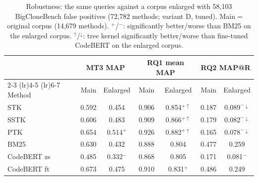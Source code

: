 \begin{table}[t]
\centering
\caption{Robustness: the same queries against a corpus enlarged with 58,103 BigCloneBench false positives (72,782 methods; variant D, tuned). Main = original corpus (14,679 methods). $^{+}$/$^{-}$: significantly better/worse than BM25 on the enlarged corpus. $^{\uparrow}$/$^{\downarrow}$: tree kernel significantly better/worse than fine-tuned CodeBERT on the enlarged corpus. }
\label{tab:e5}
\small
\begin{tabular}{lcccccc}
\toprule
 & \multicolumn{2}{c}{MT3 MAP} & \multicolumn{2}{c}{RQ1 mean MAP} & \multicolumn{2}{c}{RQ2 MAP@R} \\
\cmidrule(lr){2-3} \cmidrule(lr){4-5} \cmidrule(lr){6-7}
Method & Main & Enlarged & Main & Enlarged & Main & Enlarged \\
\midrule
STK & 0.592 & 0.454 & 0.906 & 0.854$^{+\uparrow}$ & 0.187 & 0.089$^{-\downarrow}$ \\
SSTK & 0.606 & 0.483 & 0.909 & 0.866$^{+\uparrow}$ & 0.179 & 0.082$^{-\downarrow}$ \\
PTK & 0.654 & 0.514$^{+}$ & 0.926 & 0.882$^{+\uparrow}$ & 0.165 & 0.078$^{-\downarrow}$ \\
\midrule
BM25 & 0.630 & 0.432 & 0.888 & 0.804 & 0.477 & 0.259 \\
CodeBERT zs & 0.485 & 0.332$^{-}$ & 0.868 & 0.805 & 0.171 & 0.081$^{-}$ \\
CodeBERT ft & 0.673 & 0.475 & 0.910 & 0.831$^{+}$ & 0.486 & 0.249 \\
\bottomrule
\end{tabular}
\end{table}
